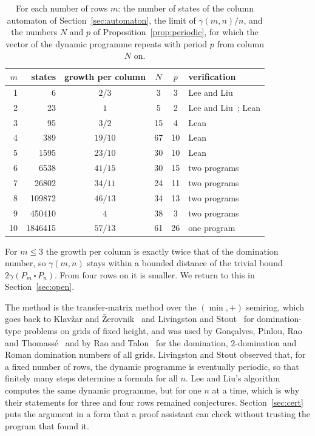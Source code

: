 \documentclass[12pt]{article}
\newcommand{\G}[2]{P_{#1}\,\square\,P_{#2}}
\theoremstyle{plain}
\theoremstyle{remark}
\begin{document}
\begin{table}[ht]
\centering
\begin{tabular}{rrcccl}
\toprule
$m$ & states & growth per column & $N$ & $p$ & verification\\
\midrule
1 & 6 & $2/3$ & 3 & 3 & Lee and Liu~\cite{ll}\\
2 & 23 & $1$ & 5 & 2 & Lee and Liu~\cite{ll}; Lean\\
3 & 95 & $3/2$ & 15 & 4 & Lean\\
4 & 389 & $19/10$ & 67 & 10 & Lean\\
5 & 1595 & $23/10$ & 30 & 10 & Lean\\
6 & 6538 & $41/15$ & 30 & 15 & two programs\\
7 & 26802 & $34/11$ & 24 & 11 & two programs\\
8 & 109872 & $46/13$ & 34 & 13 & two programs\\
9 & 450410 & $4$ & 38 & 3 & two programs\\
10 & 1846415 & $57/13$ & 61 & 26 & one program\\
\bottomrule
\end{tabular}
\caption{For each number of rows $m$: the number of states of the column automaton of
Section~\ref{sec:automaton}, the limit of $\gamma(m,n)/n$, and the numbers $N$ and $p$ of
Proposition~\ref{prop:periodic}, for which the vector of the dynamic programme repeats with
period $p$ from column $N$ on.}\label{tab:summary}
\end{table}

For $m\le3$ the growth per column is exactly twice that of the domination number, so
$\gamma(m,n)$ stays within a bounded distance of the trivial bound $2\gamma(\G mn)$. From four
rows on it is smaller. We return to this in Section~\ref{sec:open}.

The method is the transfer-matrix method over the $(\min,+)$ semiring, which goes back to
Klav\v{z}ar and \v{Z}erovnik~\cite{kz} and Livingston and Stout~\cite{ls} for domination-type
problems on grids of fixed height, and was used by Gon\c{c}alves, Pinlou, Rao and
Thomass\'e~\cite{gprt} and by Rao and Talon~\cite{rt} for the domination, $2$-domination and
Roman domination numbers of all grids. Livingston and Stout observed that, for a fixed number
of rows, the dynamic programme is eventually periodic, so that finitely many steps determine a
formula for all $n$. Lee and Liu's algorithm computes the same dynamic programme, but for one
$n$ at a time, which is why their statements for three and four rows remained conjectures.
Section~\ref{sec:cert} puts the argument in a form that a proof assistant can check without
trusting the program that found it.
\end{document}
